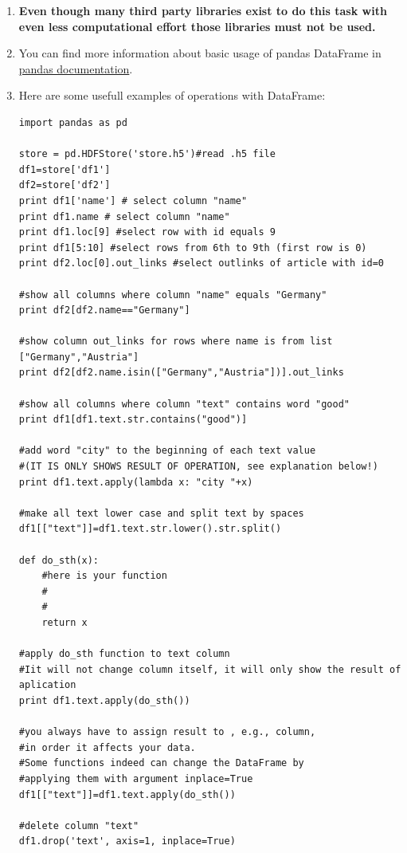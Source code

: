 \documentclass{WeSTassignment}
\begin{document}
\begin{enumerate}
\item \textbf{Even though many third party libraries exist to do this task with even less computational effort those libraries must not be used.}
\item You can find more information about basic usage of pandas DataFrame in  \href{http://pandas.pydata.org/pandas-docs/stable/dsintro.html#column-selection-addition-deletion}{pandas documentation}.
\item Here are some usefull examples of operations with DataFrame:
\begin{verbatim} 
import pandas as pd

store = pd.HDFStore('store.h5')#read .h5 file
df1=store['df1'] 
df2=store['df2'] 
print df1['name'] # select column "name"
print df1.name # select column "name"
print df1.loc[9] #select row with id equals 9 
print df1[5:10] #select rows from 6th to 9th (first row is 0) 
print df2.loc[0].out_links #select outlinks of article with id=0 

#show all columns where column "name" equals "Germany"
print df2[df2.name=="Germany"]

#show column out_links for rows where name is from list ["Germany","Austria"]
print df2[df2.name.isin(["Germany","Austria"])].out_links 

#show all columns where column "text" contains word "good" 
print df1[df1.text.str.contains("good")]

#add word "city" to the beginning of each text value 
#(IT IS ONLY SHOWS RESULT OF OPERATION, see explanation below!)
print df1.text.apply(lambda x: "city "+x)

#make all text lower case and split text by spaces
df1[["text"]]=df1.text.str.lower().str.split()

def do_sth(x):
	#here is your function
	#
	#
	return x
    
#apply do_sth function to text column 
#Iit will not change column itself, it will only show the result of aplication	 	
print df1.text.apply(do_sth())

#you always have to assign result to , e.g., column, 
#in order it affects your data.
#Some functions indeed can change the DataFrame by 
#applying them with argument inplace=True
df1[["text"]]=df1.text.apply(do_sth())  

#delete column "text"
df1.drop('text', axis=1, inplace=True)
\end{verbatim}

\end{enumerate}







\makefooter
\end{document}
